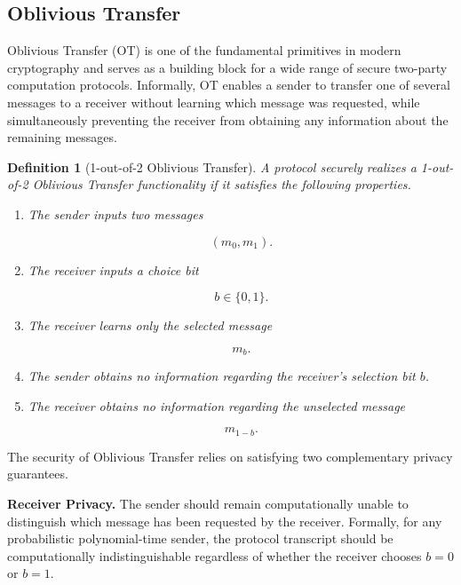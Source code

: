 \documentclass[11pt,a4paper]{article}
\newtheorem{definition}{Definition}
\begin{document}
\subsection{Oblivious Transfer}

Oblivious Transfer (OT) is one of the fundamental primitives in modern cryptography and serves as a building block for a wide range of secure two-party computation protocols. Informally, OT enables a sender to transfer one of several messages to a receiver without learning which message was requested, while simultaneously preventing the receiver from obtaining any information about the remaining messages.



\begin{definition}[1-out-of-2 Oblivious Transfer]

A protocol securely realizes a 1-out-of-2 Oblivious Transfer functionality if it satisfies the following properties.

\begin{enumerate}

\item The sender inputs two messages

\[
(m_0,m_1).
\]

\item The receiver inputs a choice bit

\[
b\in\{0,1\}.
\]

\item The receiver learns only the selected message

\[
m_b.
\]

\item The sender obtains no information regarding the receiver's selection bit $b$.

\item The receiver obtains no information regarding the unselected message

\[
m_{1-b}.
\]

\end{enumerate}

\end{definition}
The security of Oblivious Transfer relies on satisfying two complementary privacy guarantees.

\textbf{Receiver Privacy.}
The sender should remain computationally unable to distinguish which message has been requested by the receiver. Formally, for any probabilistic polynomial-time sender, the protocol transcript should be computationally indistinguishable regardless of whether the receiver chooses $b=0$ or $b=1$.
\end{document}
